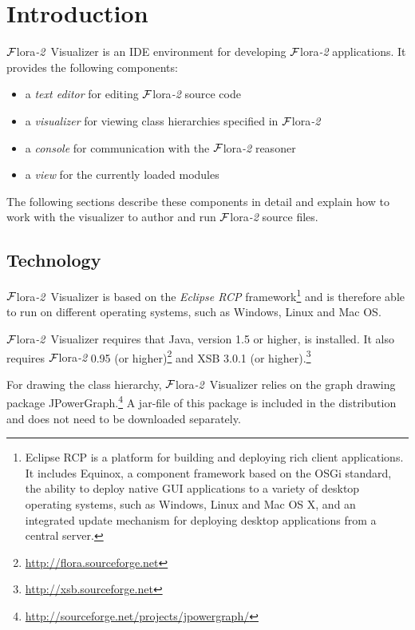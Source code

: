 \documentclass[a4paper,11pt]{article}
\newcommand{\FLORA}{{\mbox{\sc ${\cal F}${lora}\rm\emph{-2}}}\xspace}
\newcommand{\FVIZ}{{\mbox{\sc ${\cal F}${lora}\rm\emph{-2} {Visualizer}}}\xspace}
\begin{document}

\section{Introduction}
\label{sec:introduction}

\FVIZ is an IDE environment for
developing \FLORA applications. It provides the following components:
\begin{itemize}
	\item a \emph{text editor} for editing \FLORA source code
	\item a \emph{visualizer} for viewing class hierarchies specified
          in \FLORA
	\item a \emph{console} for communication with the \FLORA reasoner
	\item a \emph{view} for the currently loaded modules
\end{itemize}

The following sections describe these components in detail and explain how
to work with the visualizer to author and run \FLORA source files.

\subsection{Technology}
\label{sec:introduction_technology}

\FVIZ is based on the \emph{Eclipse RCP} framework\footnote{
Eclipse RCP is a platform for building and deploying rich client applications.
It includes Equinox, a component framework based on the OSGi standard, the
ability to deploy native GUI applications to a variety of desktop operating
systems, such as Windows, Linux and Mac OS X, and an integrated update mechanism
for deploying desktop applications from a central server.\cite{erh}
  }
and is therefore able to
run on different operating systems, such as Windows, Linux and Mac OS.

\FVIZ requires that
Java, version 1.5 or higher, is installed. It also requires
\FLORA 0.95 (or higher)\footnote{\url{http://flora.sourceforge.net}}
and XSB 3.0.1 (or higher).\footnote{\url{http://xsb.sourceforge.net}}

For drawing the class hierarchy, \FVIZ relies on the graph drawing package
JPowerGraph.\footnote{
  \url{http://sourceforge.net/projects/jpowergraph/}
}
A jar-file of this package is included in the distribution and does not
need to be downloaded separately.
\end{document}
